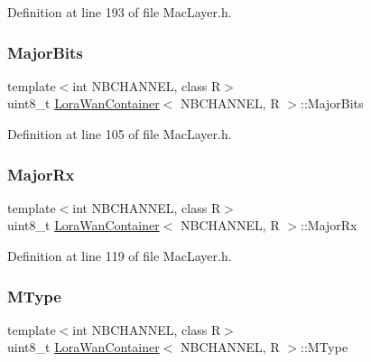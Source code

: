 Definition at line 193 of file Mac\+Layer.\+h.

\mbox{\label{class_lora_wan_container_a75a3db621a664daa6dbc0264ccc5d3fd}} 
\subsubsection{\texorpdfstring{Major\+Bits}{MajorBits}}
{\footnotesize\ttfamily template$<$int N\+B\+C\+H\+A\+N\+N\+EL, class R$>$ \\
uint8\+\_\+t \mbox{\hyperlink{class_lora_wan_container}{Lora\+Wan\+Container}}$<$ N\+B\+C\+H\+A\+N\+N\+EL, R $>$\+::Major\+Bits}



Definition at line 105 of file Mac\+Layer.\+h.

\mbox{\label{class_lora_wan_container_a7098243d9141419c21369840c5852d3f}} 
\subsubsection{\texorpdfstring{Major\+Rx}{MajorRx}}
{\footnotesize\ttfamily template$<$int N\+B\+C\+H\+A\+N\+N\+EL, class R$>$ \\
uint8\+\_\+t \mbox{\hyperlink{class_lora_wan_container}{Lora\+Wan\+Container}}$<$ N\+B\+C\+H\+A\+N\+N\+EL, R $>$\+::Major\+Rx}



Definition at line 119 of file Mac\+Layer.\+h.

\mbox{\label{class_lora_wan_container_a3381c216b989d3df72caee46d96d439a}} 
\subsubsection{\texorpdfstring{M\+Type}{MType}}
{\footnotesize\ttfamily template$<$int N\+B\+C\+H\+A\+N\+N\+EL, class R$>$ \\
uint8\+\_\+t \mbox{\hyperlink{class_lora_wan_container}{Lora\+Wan\+Container}}$<$ N\+B\+C\+H\+A\+N\+N\+EL, R $>$\+::M\+Type}



